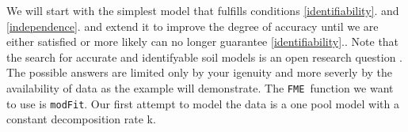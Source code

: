 \documentclass[a4paper]{article}\usepackage[]{graphicx}\usepackage[]{color}
\newcommand{\SoilR}{\texttt{SoilR }}
\newcommand{\FME}{\texttt{FME }}
\newcommand{\enumref}[1]{\ref{#1}.}
\begin{document}
We will start with the simplest model that fulfills conditions \enumref{identifiability} and \enumref{independence} and extend it to improve the degree of accuracy until we are either satisfied or more likely can no longer guarantee \enumref{identifiability}.
Note that the search for accurate and identifyable soil models is an open research question \cite{Sierra2015SBB}. 
The possible answers are limited only by your igenuity and more severly by the availability of data as the example will demonstrate.
%
The \FME function we want to use is {\tt modFit}. Our first attempt to model the data is a one pool model with a constant decomposition rate k.
\end{document}

